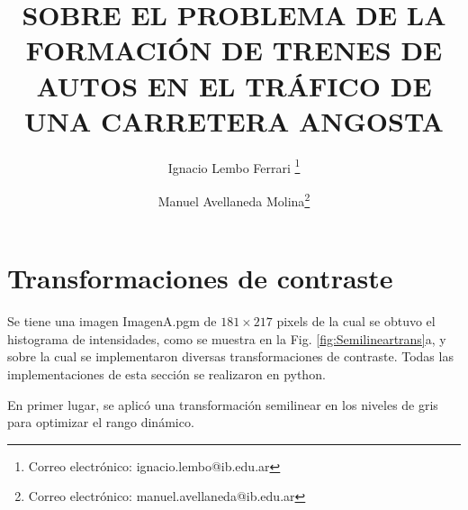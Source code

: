 \documentclass[letterpaper,12pt]{article}
\title{SOBRE EL PROBLEMA DE LA FORMACIÓN DE TRENES DE AUTOS EN EL TRÁFICO DE UNA CARRETERA ANGOSTA} %
\author[1]{Ignacio Lembo Ferrari \thanks{Correo electrónico: ignacio.lembo@ib.edu.ar}}
\author[1]{Manuel Avellaneda Molina\thanks{Correo electrónico: manuel.avellaneda@ib.edu.ar}}
\affil[1]{Instituto Balseiro}
\date{\vspace{-4ex}}
\theoremstyle{plain}
\begin{document}
\maketitle

\section{Transformaciones de contraste\label{sec:ej1ej2}}

\vspace{0.3cm}

Se tiene una imagen ImagenA.pgm de $181\times217$ pixels de la cual se obtuvo el histograma de intensidades, como se muestra en la Fig. \ref{fig:Semilineartrans}a, y sobre la cual se implementaron diversas transformaciones de contraste. Todas las implementaciones de esta sección se realizaron en python.

En primer lugar, se aplicó una transformación semilinear en los niveles de gris para optimizar el rango dinámico. 
\end{document}
